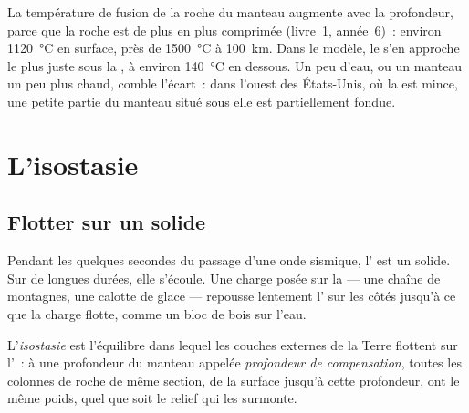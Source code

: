 La température de fusion de la roche du manteau augmente avec la
profondeur, parce que la roche est de plus en plus comprimée (livre~1,
année~6)~: environ \qty{1120}{\celsius} en surface, près de
\qty{1500}{\celsius} à \qty{100}{km}. Dans le modèle, le  s'en
approche le plus juste sous la , à environ \qty{140}{\celsius}
en dessous. Un peu d'eau, ou un manteau un peu plus chaud, comble l'écart~:
dans l'ouest des États-Unis, où la  est mince, une petite partie
du manteau situé sous elle est partiellement fondue.

\section{L'isostasie}

\subsection{Flotter sur un solide}

Pendant les quelques secondes du passage d'une onde sismique,
l' est un solide. Sur de longues durées, elle s'écoule. Une
charge posée sur la  --- une chaîne de montagnes, une calotte de
glace --- repousse lentement l' sur les côtés jusqu'à ce que la
charge flotte, comme un bloc de bois sur l'eau.

\begin{definition}\label{def:g11:lithosphere-asthenosphere:isostasy}
L'\emph{isostasie} est l'équilibre dans lequel les
couches externes de la Terre flottent sur l'~: à une
profondeur du manteau appelée \emph{profondeur de
compensation}, toutes les colonnes de
roche de même section, de la surface jusqu'à cette profondeur, ont le même
poids, quel que soit le relief qui les surmonte.
\end{definition}

